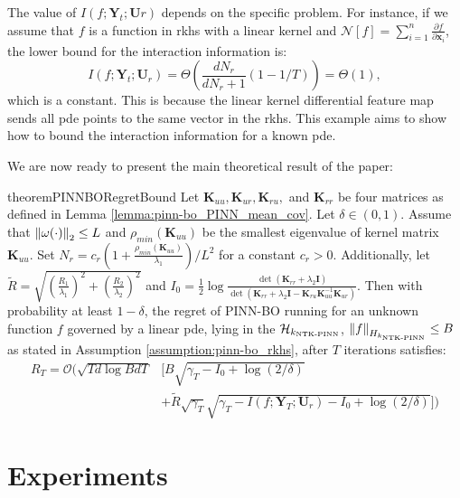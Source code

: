 \begin{remark}
The value of $I(f; \mathbf{Y}_t; \mathbf{U}r)$ depends on the specific problem. For instance, if we assume that $f$ is a function in \ac{rkhs} with a linear kernel and $\mathcal{N}[f]= \sum_{i=1}^n \frac{\partial f}{\partial \mathbf{x}_i}$, the lower bound for the interaction information is: \[
I(f; \mathbf{Y}_t; \mathbf{U}_r) = \Theta\left(\frac{d N_r}{d N_r+1}(1-1/T)\right) = \Theta(1),
\] 
which is a constant. This is because the linear kernel differential feature map sends all \ac{pde} points to the same vector in the \ac{rkhs}. This example aims to show how to bound the interaction information for a known \ac{pde}. 
\end{remark}
We are now ready to present the main theoretical result of the paper: 
\begin{restatable}{theorem}{PINNBORegretBound}
\label{theorem:pinn-bo_regret_bound}
Let $\mathbf{K}_{uu}, \mathbf{K}_{ur}, \mathbf{K}_{ru},$ and $\mathbf{K}_{rr}$ be four matrices as defined in Lemma \ref{lemma:pinn-bo_PINN_mean_cov}. 
Let $\delta \in (0,1)$. Assume that $\norm{\omega(\cdot)}_2 \le L$ and  $\rho_{min}(\mathbf{K}_{uu})$ be the smallest eigenvalue of kernel matrix $\mathbf{K}_{uu}$. Set $N_r = c_r\left(1+ \frac{\rho_{min}(\mathbf{K}_{uu})}{\lambda_1}\right)/L^2$ for a constant $c_r > 0$. Additionally,  let $\widetilde{R} = \sqrt{\left(\frac{R_1}{\lambda_1}\right)^2 + \left(\frac{R_2}{\lambda_2}\right)^2}$ and $I_0 = \frac{1}{2}\log \frac{\det(\mathbf{K}_{rr} + \lambda_2\mathbf{I})}{\det(\mathbf{K}_{rr} + \lambda_2\mathbf{I} - \mathbf{K}_{ru} \mathbf{K}_{uu}^{-1} \mathbf{K}_{ur})}$. Then with probability at least $1-\delta$, the regret of PINN-BO running for an unknown function $f$ governed by a linear \ac{pde}, lying in the $\mathcal{H}_{k_\textup{NTK-PINN}}$, $\norm{f}_{{H}_{k_\textup{NTK-PINN}}} \le B$ as stated in Assumption \ref{assumption:pinn-bo_rkhs}, after $T$ iterations satisfies:
\begin{equation*}
    \begin{aligned}
        R_T  = \mathcal{O} \Bigg(\sqrt{T d\log BdT} &\bigg[B \sqrt{\gamma_T - I_0 + \log(2/\delta)} 
        \\
        & + \widetilde{R} \sqrt{\gamma_T} \sqrt{\gamma_T - I (f; \mathbf{Y}_T; \mathbf{U}_r) - I_0 + \log(2/\delta
        )} \bigg] \Bigg)
    \end{aligned}
\end{equation*}
\end{restatable}


\section{Experiments}

